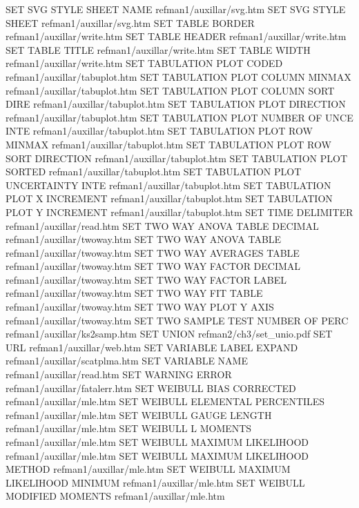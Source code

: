 SET SVG STYLE SHEET NAME                refman1/auxillar/svg.htm
SET SVG STYLE SHEET                     refman1/auxillar/svg.htm
SET TABLE BORDER                        refman1/auxillar/write.htm
SET TABLE HEADER                        refman1/auxillar/write.htm
SET TABLE TITLE                         refman1/auxillar/write.htm
SET TABLE WIDTH                         refman1/auxillar/write.htm
SET TABULATION PLOT CODED               refman1/auxillar/tabuplot.htm
SET TABULATION PLOT COLUMN MINMAX       refman1/auxillar/tabuplot.htm
SET TABULATION PLOT COLUMN SORT DIRE    refman1/auxillar/tabuplot.htm
SET TABULATION PLOT DIRECTION           refman1/auxillar/tabuplot.htm
SET TABULATION PLOT NUMBER OF UNCE INTE refman1/auxillar/tabuplot.htm
SET TABULATION PLOT ROW MINMAX          refman1/auxillar/tabuplot.htm
SET TABULATION PLOT ROW SORT DIRECTION  refman1/auxillar/tabuplot.htm
SET TABULATION PLOT SORTED              refman1/auxillar/tabuplot.htm
SET TABULATION PLOT UNCERTAINTY INTE    refman1/auxillar/tabuplot.htm
SET TABULATION PLOT X INCREMENT         refman1/auxillar/tabuplot.htm
SET TABULATION PLOT Y INCREMENT         refman1/auxillar/tabuplot.htm
SET TIME DELIMITER                      refman1/auxillar/read.htm
SET TWO WAY ANOVA TABLE DECIMAL         refman1/auxillar/twoway.htm
SET TWO WAY ANOVA TABLE                 refman1/auxillar/twoway.htm
SET TWO WAY AVERAGES TABLE              refman1/auxillar/twoway.htm
SET TWO WAY FACTOR DECIMAL              refman1/auxillar/twoway.htm
SET TWO WAY FACTOR LABEL                refman1/auxillar/twoway.htm
SET TWO WAY FIT TABLE                   refman1/auxillar/twoway.htm
SET TWO WAY PLOT Y AXIS                 refman1/auxillar/twoway.htm
SET TWO SAMPLE TEST NUMBER OF PERC      refman1/auxillar/ks2samp.htm
SET UNION                               refman2/ch3/set_unio.pdf
SET URL                                 refman1/auxillar/web.htm
SET VARIABLE LABEL EXPAND               refman1/auxillar/scatplma.htm
SET VARIABLE NAME                       refman1/auxillar/read.htm
SET WARNING ERROR                       refman1/auxillar/fatalerr.htm
SET WEIBULL BIAS CORRECTED              refman1/auxillar/mle.htm
SET WEIBULL ELEMENTAL PERCENTILES       refman1/auxillar/mle.htm
SET WEIBULL GAUGE LENGTH                refman1/auxillar/mle.htm
SET WEIBULL L MOMENTS                   refman1/auxillar/mle.htm
SET WEIBULL MAXIMUM LIKELIHOOD          refman1/auxillar/mle.htm
SET WEIBULL MAXIMUM LIKELIHOOD METHOD   refman1/auxillar/mle.htm
SET WEIBULL MAXIMUM LIKELIHOOD MINIMUM  refman1/auxillar/mle.htm
SET WEIBULL MODIFIED MOMENTS            refman1/auxillar/mle.htm
